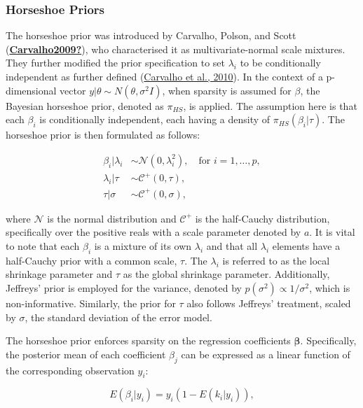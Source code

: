 \documentclass[
  11pt,
]{article}
\begin{document}
\subsubsection{Horseshoe Priors}

The horseshoe prior was introduced by Carvalho, Polson, and Scott
(\protect\hyperlink{ref-Carvalho2009}{\textbf{Carvalho2009?}}), who
characterised it as multivariate-normal scale mixtures. They further
modified the prior specification to set \(\lambda_i\) to be
conditionally independent as further defined
(\protect\hyperlink{ref-Carvalho2010}{Carvalho et al., 2010}). In the
context of a p-dimensional vector
\(y|\theta \sim N(\theta, \sigma^2I)\), when sparsity is assumed for
\(\beta\), the Bayesian horseshoe prior, denoted as \(\pi_{HS}\), is
applied. The assumption here is that each \(\beta_i\) is conditionally
independent, each having a density of \(\pi_{HS} (\beta_i | \tau)\). The
horseshoe prior is then formulated as follows:

\begin{align*}
\beta_i | \lambda_i &\sim \mathcal{N}(0, \lambda_i^2), \quad \text{for } i = 1,\ldots,p, \\
\lambda_i | \tau &\sim \mathcal{C}^+(0, \tau), \\
\tau | \sigma &\sim \mathcal{C}^+(0, \sigma), 
\end{align*}

where \(\mathcal{N}\) is the normal distribution and \(\mathcal{C}^+\)
is the half-Cauchy distribution, specifically over the positive reals
with a scale parameter denoted by \(a\). It is vital to note that each
\(\beta_i\) is a mixture of its own \(\lambda_i\) and that all
\(\lambda_i\) elements have a half-Cauchy prior with a common scale,
\(\tau\). The \(\lambda_i\) is referred to as the local shrinkage
parameter and \(\tau\) as the global shrinkage parameter. Additionally,
Jeffreys' prior is employed for the variance, denoted by
\(p(\sigma^2) \propto 1/\sigma^2\), which is non-informative. Similarly,
the prior for \(\tau\) also follows Jeffreys' treatment, scaled by
\(\sigma\), the standard deviation of the error model.

The horseshoe prior enforces sparsity on the regression coefficients
\(\boldsymbol{\beta}\). Specifically, the posterior mean of each
coefficient \(\beta_j\) can be expressed as a linear function of the
corresponding observation \(y_i\):

\begin{equation}
E(\beta_i|y_i) = y_i(1 - E(k_i|y_i)),
\end{equation}
\end{document}
